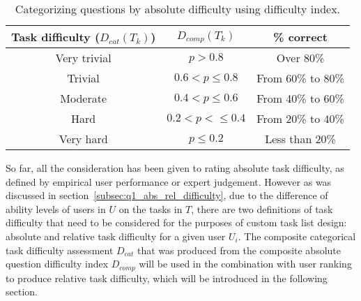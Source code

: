 \begin{table}[h!]
    \centering
    \begin{tabular}{||c | c | c ||}
        \hline
        Task difficulty ($D_{cat}(T_k)$) & $D_{comp}(T_k)$ & \% correct \\
        \hline
        \hline
        Very trivial & $p > 0.8$ & Over 80\% \\
        \hline
        Trivial & $0.6 < p \leq 0.8$ & From 60\% to 80\% \\
        \hline
        Moderate & $0.4 < p \leq 0.6$ & From 40\% to 60\% \\
        \hline
        Hard & $0.2 < p < \leq 0.4$ & From 20\% to 40\% \\
        \hline
        Very hard & $p \leq 0.2$ & Less than 20\% \\
        \hline
    \end{tabular}
    \caption{Categorizing questions by absolute difficulty using difficulty index.}
    \label{tab:difficulty_index}
\end{table}

So far, all the consideration has been given to rating absolute task difficulty, as defined by empirical user performance or expert judgement.
However as was discussed in section~\ref{subsec:q1_abs_rel_difficulty}, due to the difference of ability levels of users in $U$ on the tasks in $T$, there are two definitions of task difficulty that need to be considered for the purposes of custom task list design: absolute and relative task difficulty for a given user $U_i$.
The composite categorical task difficulty assessment $D_{cat}$ that was produced from the composite absolute question difficulty index $D_{comp}$ will be used in the combination with user ranking to produce relative task difficulty, which will be introduced in the following section.